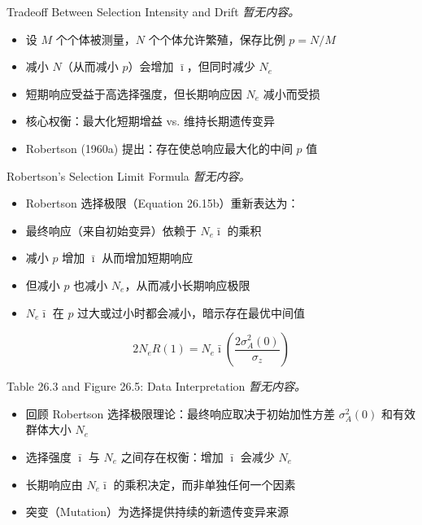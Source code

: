 \documentclass[10pt, aspectratio=169]{ctexbeamer}
\providecommand{\kgimageplaceholder}[2][]{%
  \begin{center}
    \fbox{\parbox{0.55\textwidth}{\centering\vspace{1.2cm} #2 \vspace{1.2cm}}}
  \end{center}%
}
\begin{document}
\begin{frame}{Tradeoff Between Selection Intensity and Drift}
  \textit{暂无内容。}
  \vspace{0.3cm}
  \begin{itemize}
    \item 设 $M$ 个个体被测量，$N$ 个个体允许繁殖，保存比例 $p = N/M$
    \item 减小 $N$（从而减小 $p$）会增加 $\bar{\imath}$，但同时减少 $N_e$
    \item 短期响应受益于高选择强度，但长期响应因 $N_e$ 减小而受损
    \item 核心权衡：最大化短期增益 vs. 维持长期遗传变异
    \item Robertson (1960a) 提出：存在使总响应最大化的中间 $p$ 值
  \end{itemize}
\end{frame}

\begin{frame}{Robertson's Selection Limit Formula}
  \textit{暂无内容。}
  \vspace{0.3cm}
  \begin{itemize}
    \item Robertson 选择极限（Equation 26.15b）重新表达为：
    \item 最终响应（来自初始变异）依赖于 $N_e \bar{\imath}$ 的乘积
    \item 减小 $p$ 增加 $\bar{\imath}$ 从而增加短期响应
    \item 但减小 $p$ 也减小 $N_e$，从而减小长期响应极限
    \item $N_e \bar{\imath}$ 在 $p$ 过大或过小时都会减小，暗示存在最优中间值
  \end{itemize}
  \[
    2N_{e}R(1) = N_{e}\bar{\imath}\left(\frac{2\sigma_{A}^{2}(0)}{\sigma_{z}}\right) \tag{26.22}
  \]
\end{frame}

\begin{frame}{Table 26.3 and Figure 26.5: Data Interpretation}
  \textit{暂无内容。}
  \vspace{0.3cm}
  \kgimageplaceholder[figure=Figure 26.5,center,x=500,y=120,width=235,height=165]{Figure 26.5}
  \begin{itemize}
    \item 回顾 Robertson 选择极限理论：最终响应取决于初始加性方差 $\sigma_A^2(0)$ 和有效群体大小 $N_e$
    \item 选择强度 $\bar{\imath}$ 与 $N_e$ 之间存在权衡：增加 $\bar{\imath}$ 会减少 $N_e$
    \item 长期响应由 $N_e \bar{\imath}$ 的乘积决定，而非单独任何一个因素
    \item 突变（Mutation）为选择提供持续的新遗传变异来源
  \end{itemize}
\end{frame}
\end{document}
